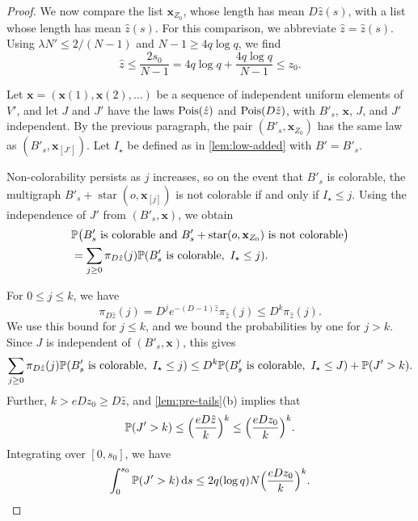\begin{proof}
We now compare the list $\mathbf x_{Z_0}$, whose length has mean $D\hat z(s)$, with a list whose length has mean $\hat z(s)$. For this comparison, we abbreviate $\hat z = \hat z(s)$. Using $\lambda N' \le 2/(N - 1)$ and $N - 1 \ge 4q \log q$, we find
\begin{equation}\label{eq:low-zeta}
\hat z \le \frac{2 s_0}{N - 1} = 4q \log q + \frac{4q \log q}{N - 1} \le z_0.
\end{equation}

Let $\mathbf x = (\mathbf x(1), \mathbf x(2), \dots)$ be a sequence of independent uniform elements of $V'$, and let $J$ and $J'$ have the laws $\operatorname{Pois}(\hat z)$ and $\operatorname{Pois}(D \hat z)$, with $B'_s$, $\mathbf x$, $J$, and $J'$ independent. By the previous paragraph, the pair $(B'_s, \mathbf x_{Z_0})$ has the same law as $(B'_s, \mathbf x_{[J']})$. Let $I_\star$ be defined as in \cref{lem:low-added} with $B' = B'_s$.

Non-colorability persists as $j$ increases, so on the event that $B'_s$ is colorable, the multigraph $B'_s + \operatorname{star}(o, \mathbf x_{[j]})$ is not colorable if and only if $I_\star \le j$. Using the independence of $J'$ from $(B'_s, \mathbf x)$, we obtain
\begin{equation*}
\begin{aligned}
&\Pp\bigl(B'_s \text{ is colorable and } B'_s + \operatorname{star}(o, \mathbf x_{Z_0}) \text{ is not colorable}\bigr) \\
&= \sum_{j \ge 0} \pi_{D \hat z}(j) \Pp(B'_s \text{ is colorable}, \ I_\star \le j).
\end{aligned}
\end{equation*}

For $0 \le j \le k$, we have
\begin{equation*}
\pi_{D \hat z}(j) = D^j e^{-(D - 1) \hat z} \pi_{\hat z}(j) \le D^k \pi_{\hat z}(j).
\end{equation*}
We use this bound for $j \le k$, and we bound the probabilities by one for $j > k$. Since $J$ is independent of $(B'_s, \mathbf x)$, this gives
\begin{equation}\label{eq:low-tilt}
\sum_{j \ge 0} \pi_{D \hat z}(j) \Pp(B'_s \text{ is colorable}, \ I_\star \le j) \le D^k \Pp(B'_s \text{ is colorable}, \ I_\star \le J) + \Pp(J' > k).
\end{equation}
Further, $k > e D z_0 \ge D \hat z$, and \cref{lem:pre-tails}(b) implies that
\begin{equation*}
\mathbb P(J' > k) \le \Bigl(\frac{e D \hat z}{k}\Bigr)^k \le \Bigl(\frac{e D z_0}{k}\Bigr)^k.
\end{equation*}
Integrating over $[0, s_0]$, we have
\begin{equation}\label{eq:low-tail}
\int_0^{s_0} \mathbb P(J' > k) \,\mathrm d s \le 2q (\log q) N \Bigl(\frac{e D z_0}{k}\Bigr)^k.
\end{equation}


\end{proof}
